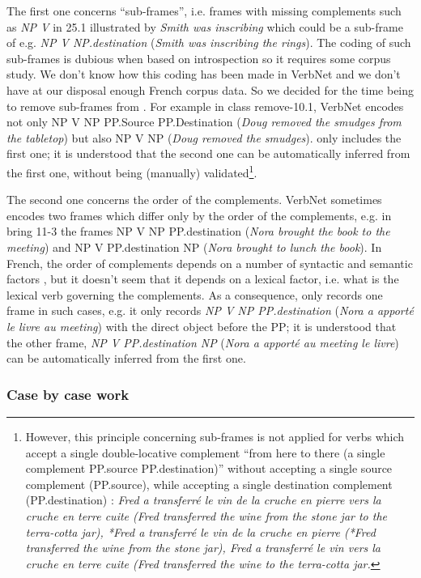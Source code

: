 The first one concerns ``sub-frames'', i.e. frames with missing complements such
as \emph{NP V} in 25.1 illustrated by \emph{Smith was inscribing} which could
be  a sub-frame of e.g. \emph{NP V NP.destination} (\emph{Smith was inscribing
the rings}). The coding of such sub-frames is dubious when based on
introspection so it requires some corpus study.  We don't know how this coding
has been made in VerbNet and we don't have at our disposal enough French corpus
data.  So we decided for the time being to remove sub-frames from \verbenet{}.
For example in class remove-10.1, VerbNet encodes not only NP V NP PP.Source
PP.Destination (\emph{Doug removed the smudges from the tabletop}) but also NP
V NP (\emph{Doug removed the smudges}). \verbenet{} only includes the first
one; it is understood that the second one can be automatically inferred from
the first one, without being (manually) validated\footnote{However, this
principle concerning sub-frames is not applied for verbs which accept a single
double-locative complement ``from here to there (a single complement PP.source
PP.destination)''  without accepting a single source complement (PP.source),
while accepting a single destination complement (PP.destination) : \emph{Fred a
transferré le vin de la cruche en pierre vers la cruche en terre cuite  (Fred
transferred the wine from the stone jar to the terra-cotta jar), *Fred a
transferré le vin de la cruche en pierre (*Fred transferred the wine from the
stone jar), Fred a transferré le vin vers la cruche en terre cuite (Fred
transferred the wine to the terra-cotta  jar.}}.

The second one concerns the order of the complements. VerbNet sometimes encodes
two frames which differ only by the order of the complements, e.g. in bring
11-3 the frames NP V NP PP.destination (\emph{Nora brought the book to the
meeting}) and NP V PP.destination NP (\emph{Nora brought to lunch the book}).
In French, the order of complements  depends on a number of syntactic and
semantic factors \citep{thuilier2012contraintes}, but it doesn't seem that
it depends on a lexical factor, i.e. what is the lexical verb governing the
complements. As a consequence, \verbenet{} only records one frame in such
cases, e.g. it only records \emph{NP V NP PP.destination} (\emph{Nora a
apporté le livre au meeting}) with the direct object before the PP; it is
understood that the other frame, \emph{NP V  PP.destination NP} (\emph{Nora a
apporté au meeting le livre}) can be automatically inferred from the first
one.

\subsubsection{Case by case work}\label{durty}

